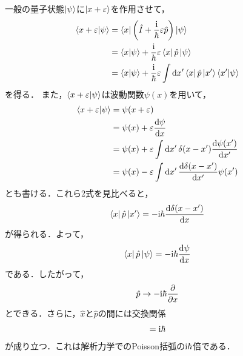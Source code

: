 \documentclass{report}
\begin{document}
  一般の量子状態$\ket{\psi}$に$\ket{x+\varepsilon}$を作用させて，
  \begin{align}
    \bra{x+\varepsilon}\ket{\psi} &= \bra{x}\qty(\hat{I} + \frac{\mathrm{i}}{\hbar}\varepsilon\hat{p})\ket{\psi}\\
    &=\braket{x}{\psi} + \frac{\mathrm{i}}{\hbar}\varepsilon\bra{x}\hat{p}\ket{\psi}\\
    &= \braket{x}{\psi} + \frac{\mathrm{i}}{\hbar} \varepsilon\int\dd{x'}\bra{x}\hat{p}\ket{x'}\bra{x'}\ket{\psi}
  \end{align}
  を得る．
  また，$\braket{x+\varepsilon}{\psi}$は波動関数$\psi(x)$を用いて，
  \begin{align}
    \braket{x+\varepsilon}{\psi} &= \psi(x+\varepsilon)\\
    &= \psi(x) + \varepsilon\dv{\psi}{x}\\
    &= \psi(x) + \varepsilon \int \dd{x'}\delta(x-x')\dv{\psi(x')}{x'}\\
    &= \psi(x) - \varepsilon\int\dd{x'}\dv{\delta(x-x')}{x'}\psi(x')
  \end{align}
  とも書ける．これら2式を見比べると，
  \begin{align}
    \bra{x}\hat{p}\ket{x'} = -\mathrm{i}\hbar\dv{\delta(x-x')}{x}
  \end{align}
  が得られる．よって，
  \begin{align}
    \bra{x}\hat{p}\ket{\psi} = -\mathrm{i}\hbar\dv{\psi}{x}
  \end{align}
  である．したがって，
  \begin{align}
    \hat{p} \to -\mathrm{i}\hbar\frac{\partial}{\partial x}
  \end{align}
  とできる．さらに，$\hat{x}$と$\hat{p}$の間には交換関係
  \begin{align}
    [\hat{x},\hat{p}] = \i\hbar
  \end{align}
  が成り立つ．これは解析力学でのPoisson括弧の$\mathrm{i}\hbar$倍である．
\end{document}
